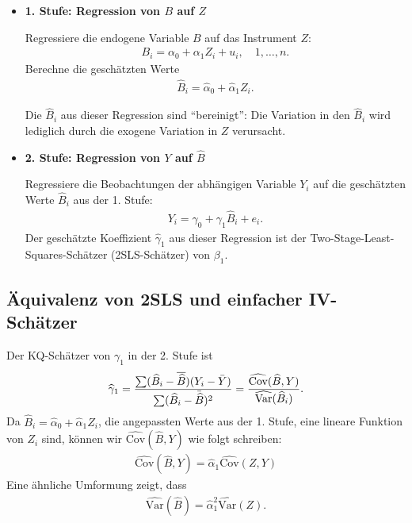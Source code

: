 \documentclass[
  a4paper,
  DIV=11,
  oneside]{scrreprt}
\begin{document}
\begin{itemize}
\item
  \textbf{1. Stufe: Regression von \(B\) auf \(Z\)}

  Regressiere die endogene Variable \(B\) auf das Instrument \(Z\):
  \begin{align}
      B_i = \alpha_0 + \alpha_1 Z_i + u_i, \quad 1,\dots,n.
    \end{align} Berechne die geschätzten Werte \begin{align}
      \widehat{B}_i = \widehat{\alpha}_0 + \widehat{\alpha}_1 Z_i.
    \end{align}

  Die \(\widehat{B}_i\) aus dieser Regression sind ``bereinigt'': Die
  Variation in den \(\widehat{B}_i\) wird lediglich durch die exogene
  Variation in \(Z\) verursacht.
\item
  \textbf{2. Stufe: Regression von \(Y\) auf \(\widehat{B}\)}

  Regressiere die Beobachtungen der abhängigen Variable \(Y_i\) auf die
  geschätzten Werte \(\widehat{B}_i\) aus der 1. Stufe: \begin{align}
      Y_i = \gamma_0 + \gamma_1 \widehat{B}_i + e_i.
    \end{align} Der geschätzte Koeffizient \(\widehat{\gamma}_1\) aus
  dieser Regression ist der Two-Stage-Least-Squares-Schätzer
  (2SLS-Schätzer) von \(\beta_1\).
\end{itemize}

\subsection{Äquivalenz von 2SLS und einfacher
IV-Schätzer}\label{sec-equiviv}

Der KQ-Schätzer von \(\gamma_1\) in der 2. Stufe ist \begin{align}
  \widehat{\gamma}_1 = \frac{\sum (\widehat{B}_i - \overline{\widehat{B}})(Y_i - \bar{Y})}{\sum (\widehat{B}_i - \bar{\widehat{B}})^2} = \frac{\widehat{\text{Cov}}(\widehat{B}, Y)}{\widehat{\textup{Var}}(\widehat{B}_i)}.
\end{align} Da
\(\widehat{B}_i = \widehat{\alpha}_0 + \widehat{\alpha}_1 Z_i\), die
angepassten Werte aus der 1. Stufe, eine lineare Funktion von \(Z_i\)
sind, können wir \(\widehat{\text{Cov}}(\widehat{B}, Y)\) wie folgt
schreiben: \begin{align}
  \widehat{\text{Cov}}(\widehat{B}, Y) = \widehat{\alpha}_1 \widehat{\text{Cov}}(Z, Y)
\end{align} Eine ähnliche Umformung zeigt, dass \begin{align}
  \widehat{\text{Var}}(\widehat{B}) = \widehat{\alpha}_1^2 \widehat{\text{Var}}(Z).
\end{align}
\end{document}
